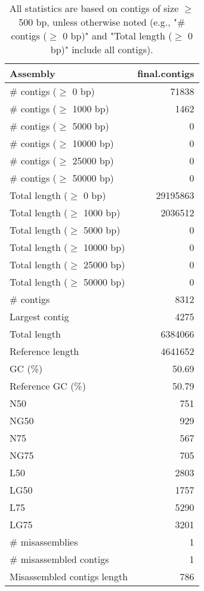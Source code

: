 \documentclass[12pt,a4paper]{article}
\begin{document}
\begin{table}[ht]
\begin{center}
\caption{All statistics are based on contigs of size $\geq$ 500 bp, unless otherwise noted (e.g., "\# contigs ($\geq$ 0 bp)" and "Total length ($\geq$ 0 bp)" include all contigs).}
\begin{tabular}{|l*{1}{|r}|}
\hline
Assembly & final.contigs \\ \hline
\# contigs ($\geq$ 0 bp) & 71838 \\ \hline
\# contigs ($\geq$ 1000 bp) & 1462 \\ \hline
\# contigs ($\geq$ 5000 bp) & 0 \\ \hline
\# contigs ($\geq$ 10000 bp) & 0 \\ \hline
\# contigs ($\geq$ 25000 bp) & 0 \\ \hline
\# contigs ($\geq$ 50000 bp) & 0 \\ \hline
Total length ($\geq$ 0 bp) & 29195863 \\ \hline
Total length ($\geq$ 1000 bp) & 2036512 \\ \hline
Total length ($\geq$ 5000 bp) & 0 \\ \hline
Total length ($\geq$ 10000 bp) & 0 \\ \hline
Total length ($\geq$ 25000 bp) & 0 \\ \hline
Total length ($\geq$ 50000 bp) & 0 \\ \hline
\# contigs & 8312 \\ \hline
Largest contig & 4275 \\ \hline
Total length & 6384066 \\ \hline
Reference length & 4641652 \\ \hline
GC (\%) & 50.69 \\ \hline
Reference GC (\%) & 50.79 \\ \hline
N50 & 751 \\ \hline
NG50 & 929 \\ \hline
N75 & 567 \\ \hline
NG75 & 705 \\ \hline
L50 & 2803 \\ \hline
LG50 & 1757 \\ \hline
L75 & 5290 \\ \hline
LG75 & 3201 \\ \hline
\# misassemblies & 1 \\ \hline
\# misassembled contigs & 1 \\ \hline
Misassembled contigs length & 786 \\ \hline

\end{tabular}
\end{center}
\end{table}
\end{document}
